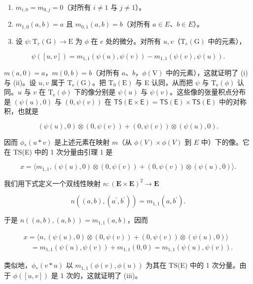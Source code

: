\begin{enumerate}
\def\labelenumi{(\roman{enumi})}
\item
  \(m_{i,0} = m_{0,j} = 0\)（对所有 \(i \neq 1\) 与 \(j \neq 1\)）。
\item
  \(m_{1,0}(a,b)=a\) 且 \(m_{0,1}(a,b)=b\)（对所有 \(a\in E\)、\(b\in E\)）。
\item
  设 \(\psi: \mathrm{T}_e(\mathrm{G}) \to \mathrm{E}\) 为 \(\phi\) 在 \(e\) 处的微分。对所有 \(u, v\)（\(\mathrm{T}_e(\mathrm{G})\) 中的元素），
\end{enumerate}

\[
\psi ([ u, v ]) = m _ {1, 1} (\psi (u), \psi (v)) - m _ {1, 1} (\psi (v), \psi (u)).
\]

\(m(a,0) = a\)，\(m(0,b) = b\)（对所有 \(a\)、\(b\)，\(\phi (\mathrm{V})\) 中的元素），这就证明了 (i) 与 (ii)。设 \(u, v\) 属于 \(\mathrm{T_e(G)}\)。把 \(\mathrm{T_0(E)}\) 与 E 认同，从而把 \(\psi\) 与 \(\mathrm{T_e}(\phi)\) 认同。\(u\) 与 \(v\) 在 \(\mathrm{T_e}(\phi)\) 下的像分别是 \(\psi (u)\) 与 \(\psi (v)\)。这些像的张量积点分布是 \((\psi(u),0)\) 与 \((0,\psi (v))\) 在 \(\mathsf{TS(E\times E)} = \mathsf{TS(E)}\times \mathsf{TS(E)}\) 中的对称积，也就是

\[
(\psi (u), 0) \otimes (0, \psi (v)) + (0, \psi (v)) \otimes (\psi (u), 0).
\]

因而 \(\phi_{*} (u * v)\) 是上述元素在映射 \(m\)（从 \(\phi(V) \times \phi(V)\) 到 \(E\) 中）下的像。它在 TS(E) 中的 1 次分量由引理 1 是

\[
x = \langle m _ {1, 1}, (\psi (u), 0) \otimes (0, \psi (v)) + (0, \psi (v)) \otimes (\psi (u), 0) \rangle .
\]

我们用下式定义一个双线性映射 \(n\colon (\mathbf{E}\times \mathbf{E})^2\to \mathbf{E}\)

\[
n ((a, b), (a ^ {\prime}, b ^ {\prime})) = m _ {1, 1} (a, b ^ {\prime}).
\]

于是 \(n((a, b), (a, b)) = m_{1,1}(a, b)\)，因而

\[
\begin{array}{l} x = \langle n, (\psi (u), 0) \otimes (0, \psi (v)) + (0, \psi (v)) \otimes (\psi (u), 0) \rangle \\ \quad = m _ {1, 1} (\psi (u), \psi (v)) + m _ {1, 1} (0, 0) = m _ {1, 1} (\psi (u), \psi (v)). \end{array}
\]

类似地，\(\phi_{*} (v * u)\) 以 \(m_{1,1}(\phi(v), \phi(u))\) 为其在 TS(E) 中的 1 次分量。由于 \(\phi([u, v])\) 是 1 次的，这就证明了 (iii)。

